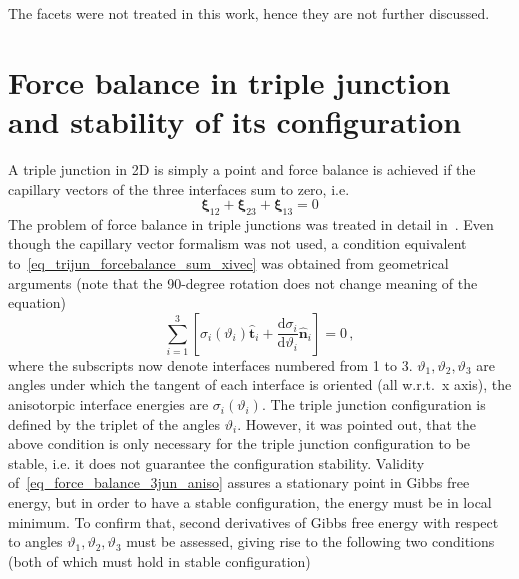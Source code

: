 The facets were not treated in this work, hence they are not further discussed.

\section{Force balance in triple junction and stability of its configuration} \label{sec_intro_trijun_forcebalance_stability}
A triple junction in 2D is simply a point and force balance is achieved if the capillary vectors of the three interfaces sum to zero, i.e. 
\begin{equation} \label{eq_trijun_forcebalance_sum_xivec}
    \bm{\xi}_{12}+\bm{\xi}_{23}+\bm{\xi}_{13}=0
\end{equation}
The problem of force balance in triple junctions was treated in detail in~\cite{Marks2012}. Even though the capillary vector formalism was not used, a condition equivalent to~\eqref{eq_trijun_forcebalance_sum_xivec} was obtained from geometrical arguments (note that the 90-degree rotation does not change meaning of the equation)
\begin{equation} \label{eq_force_balance_3jun_aniso}
    \sum_{i=1}^3 \left[ \sigma_i(\vartheta_i)\hat{\bm{t}}_i +\frac{\mathrm{d} \sigma_i}{\mathrm{d} \vartheta_i}\hat{\bm{n}}_i \right] = 0 \,,
\end{equation}
where the subscripts now denote interfaces numbered from 1 to 3. $\vartheta_1,\vartheta_2,\vartheta_3$ are angles under which the tangent of each interface is oriented (all w.r.t.\ x axis),  the anisotorpic interface energies are $\sigma_i(\vartheta_i)$. The triple junction configuration is defined by the triplet of the angles $\vartheta_i$. However, it was pointed out, that the above condition is only necessary for the triple junction configuration to be stable, i.e. it does not guarantee the configuration stability. Validity of~\eqref{eq_force_balance_3jun_aniso} assures a stationary point in Gibbs free energy, but in order to have a stable configuration, the energy must be in local minimum. To confirm that, second derivatives of Gibbs free energy with respect to angles $\vartheta_1,\vartheta_2,\vartheta_3$ must be assessed, giving rise to the following two conditions (both of which must hold in stable configuration)
